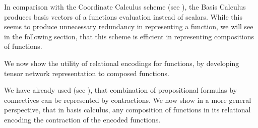 In comparison with the Coordinate Calculus scheme (see ), the Basis Calculus produces basis vectors of a functions evaluation instead of scalars.
While this seems to produce unnecessary redundancy in representing a function, we will see in the following section, that this scheme is efficient in representing compositions of functions.


We now show the utility of relational encodings for functions, by developing tensor network representation to composed functions.


We have already used (see ), that combination of propositional formulas by connectives can be represented by contractions.
We now show in a more general perspective, that in basis calculus, any composition of functions in its relational encoding the contraction of the encoded functions.

